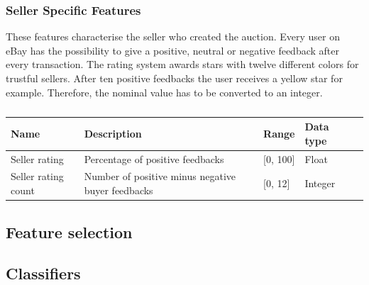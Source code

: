 \subsubsection{Seller Specific Features}
These features characterise the seller who created the auction. Every user on eBay has the possibility to give a positive, neutral or negative feedback after every transaction. The rating system awards stars with twelve different colors for trustful sellers. After ten positive feedbacks the user receives a yellow star for example. Therefore, the nominal value has to be converted to an integer.
\begin{table}[h!]
	\begin{center}
	\begin{tabular}{| l | l | l | l | l |}
		\hline
		Name & Description &  Range & Data type \\
		\hline
		Seller rating & Percentage of positive feedbacks & [0, 100] & Float \\
		\hline
		Seller rating count & Number of positive minus negative buyer feedbacks & [0, 12] & Integer \\
		\hline
	\end{tabular}
	\end{center}
	\caption{}
\end{table}
\subsection{Feature selection}
\subsection{Classifiers}
